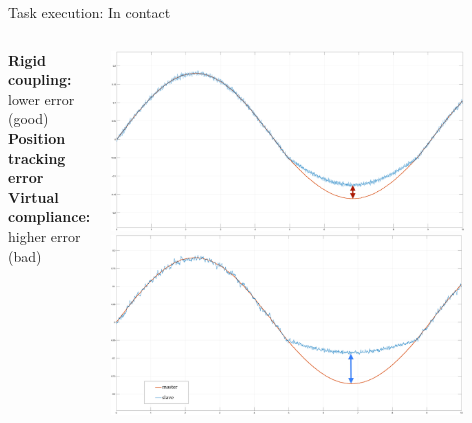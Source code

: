 \documentclass[10pt]{beamer}
\begin{document}
\begin{frame}{Task execution: In contact}
  \smallskip
  \begin{columns}
    \color{Orange}\textbf{Rigid coupling:}\\
    lower error (good)\\
    \bigskip
    \bigskip
    \bigskip
    \color{black}\textbf{Position tracking error }\\
    \bigskip
    \bigskip
    \bigskip
    \color{LightBlue}\textbf{Virtual compliance:}\\
    higher error (bad)

    \includegraphics[width=\textwidth,
    height=0.43\textwidth]{../reportTeleop/Images/rigidContactReacPosArrow}
    \smallskip
    \includegraphics[width=\textwidth,
    height=0.43\textwidth]{../reportTeleop/Images/setPointContactReacPosArrow}\\

 \end{columns}
\end{frame}
\end{document}
